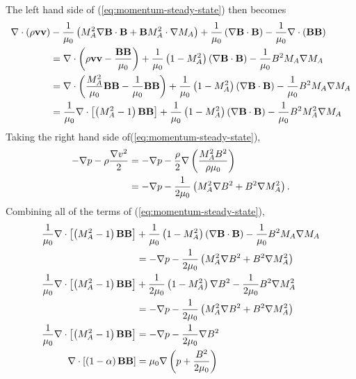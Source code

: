 The left hand side of (\ref{eq:momentum-steady-state}) then becomes
\[
\begin{split}
    \nabla \cdot\left( \rho\mathbf{v}\mathbf{v} \right) &- \frac{1}{\mu_0}\left( M_A^2\nabla\mathbf{B}\cdot\mathbf{B} + \mathbf{B} M_A^2\cdot\nabla M_A \right) + \frac{1}{\mu_0}\left( \nabla\mathbf{B}\cdot\mathbf{B} \right) - \frac{1}{\mu_0}\nabla \cdot\left( \mathbf{B}\mathbf{B} \right) \\
    &= \nabla \cdot\left( \rho\mathbf{v}\mathbf{v} - \frac{\mathbf{B}\mathbf{B}}{\mu_0} \right) + \frac{1}{\mu_0}\left( 1-M_A^2 \right)\left( \nabla\mathbf{B}\cdot\mathbf{B} \right) - \frac{1}{\mu_0}B^2 M_A\nabla M_A \\
    &= \nabla \cdot\left( \frac{M_A^2}{\mu_0}\mathbf{B}\mathbf{B} - \frac{1}{\mu_0}\mathbf{B}\mathbf{B} \right) + \frac{1}{\mu_0}\left( 1-M_A^2 \right)\left( \nabla\mathbf{B}\cdot\mathbf{B} \right) - \frac{1}{\mu_0}B^2M_A\nabla M_A \\
    &= \frac{1}{\mu_0}\nabla \cdot\left[ \left( M_A^2-1 \right)\mathbf{B}\mathbf{B} \right] + \frac{1}{\mu_0}\left( 1-M_A^2 \right)\left( \nabla\mathbf{B}\cdot\mathbf{B} \right) - \frac{1}{\mu_0}B^2 M_A^2\nabla M_A \\
\end{split}
\]
Taking the right hand side of(\ref{eq:momentum-steady-state}), 
\[
\begin{split}
    -\nabla p -\rho\frac{\nabla v^2}{2} &= -\nabla p -\frac{\rho}{2}\nabla\left( \frac{M_A^2 B^2}{\rho\mu_0} \right) \\
    &= -\nabla p - \frac{1}{2\mu_0}\left( M_A^2 \nabla B^2 + B^2\nabla M_A^2 \right). \\
\end{split}
\]
Combining all of the terms of (\ref{eq:momentum-steady-state}),
\begin{equation}
    \begin{split}
        \frac{1}{\mu_0}\nabla \cdot\left[ \left( M_A^2-1 \right)\mathbf{B}\mathbf{B} \right] &+ \frac{1}{\mu_0}\left( 1-M_A^2 \right)\left( \nabla\mathbf{B}\cdot\mathbf{B} \right) - \frac{1}{\mu_0}B^2 M_A\nabla M_A \\
        &= -\nabla p - \frac{1}{2\mu_0}\left( M_A^2 \nabla B^2 + B^2\nabla M_A^2 \right) \\
        \frac{1}{\mu_0}\nabla \cdot\left[ \left( M_A^2-1 \right)\mathbf{B}\mathbf{B} \right] &+ \frac{1}{2\mu_0}\left( 1-M_A^2 \right)\nabla B^2 - \frac{1}{2\mu_0}B^2\nabla M_A^2 \\
        &= -\nabla p - \frac{1}{2\mu_0}\left( M_A^2 \nabla B^2 + B^2\nabla M_A^2 \right) \\
        \frac{1}{\mu_0}\nabla \cdot\left[ \left( M_A^2-1 \right)\mathbf{B}\mathbf{B} \right] &= - \nabla p -\frac{1}{2\mu_0}\nabla B^2 \\
        \nabla \cdot\left[ \left( 1-\alpha \right)\mathbf{B}\mathbf{B} \right] &= \mu_0\nabla\left( p + \frac{B^2}{2\mu_0} \right) \\
    \end{split}
    \label{eq:deldotBB}
\end{equation}
